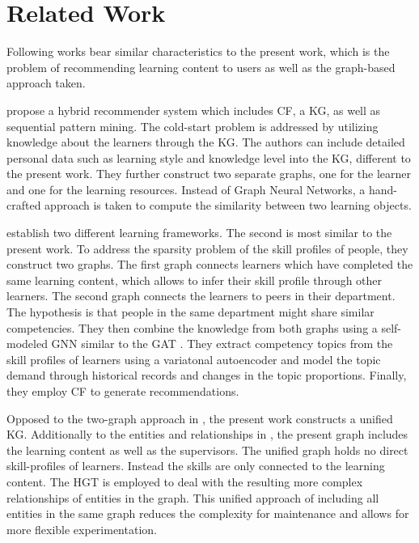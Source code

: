 \chapter{Related Work}
\label{ch:relatedwork}
Following works bear similar characteristics to the present work, which is the problem of recommending learning content to users as well as the graph-based approach taken.

\textcite{tarus2017hybrid} propose a hybrid recommender system which includes CF, a KG, as well as sequential pattern mining. The cold-start problem is addressed by utilizing knowledge about the learners through the KG. The authors can include detailed personal data such as learning style and knowledge level into the KG, different to the present work. They further construct two separate graphs, one for the learner and one for the learning resources. Instead of Graph Neural Networks, a hand-crafted approach is taken to compute the similarity between two learning objects.

\textcite{wang2021personalized} establish two different learning frameworks. The second is most similar to the present work. To address the sparsity problem of the skill profiles of people, they construct two graphs. The first graph connects learners which have completed the same learning content, which allows to infer their skill profile through other learners. The second graph connects the learners to peers in their department. The hypothesis is that people in the same department might share similar competencies. They then combine the knowledge from both graphs using a self-modeled GNN similar to the GAT \parencite{velivckovic2017graph}. They extract competency topics from the skill profiles of learners using a variatonal autoencoder \parencite{kingma2013auto} and model the topic demand through historical records and changes in the topic proportions. Finally, they employ CF to generate recommendations. 

Opposed to the two-graph approach in  \parencite{wang2021personalized}, the present work constructs a unified KG. Additionally to the entities and relationships in \parencite{wang2021personalized}, the present graph includes the learning content as well as the supervisors. The unified graph holds no direct skill-profiles of learners. Instead the skills are only connected to the learning content. The HGT is employed to deal with the resulting more complex relationships of entities in the graph. This unified approach of including all entities in the same graph reduces the complexity for maintenance and allows for more flexible experimentation.



